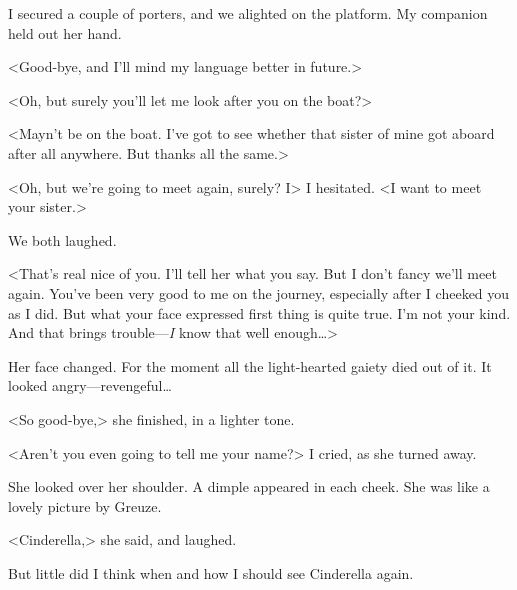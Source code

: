  I secured a couple of porters, and we alighted on the platform. My companion held out her hand. 

 <Good-bye, and I'll mind my language better in future.> 

 <Oh, but surely you'll let me look after you on the boat?> 

 <Mayn't be on the boat. I've got to see whether that sister of mine got aboard after all anywhere. But thanks all the same.> 

 <Oh, but we're going to meet again, surely? I\longdash> I hesitated. <I want to meet your sister.> 

 We both laughed. 

 <That's real nice of you. I'll tell her what you say. But I don't fancy we'll meet again. You've been very good to me on the journey, especially after I cheeked you as I did. But what your face expressed first thing is quite true. I'm not your kind. And that brings trouble—\emph{I} know that well enough\dots> 

 Her face changed. For the moment all the light-hearted gaiety died out of it. It looked angry—revengeful\dots 

 <So good-bye,> she finished, in a lighter tone. 

 <Aren't you even going to tell me your name?> I cried, as she turned away. 

 She looked over her shoulder. A dimple appeared in each cheek. She was like a lovely picture by Greuze. 

 <Cinderella,> she said, and laughed. 

 But little did I think when and how I should see Cinderella again.
